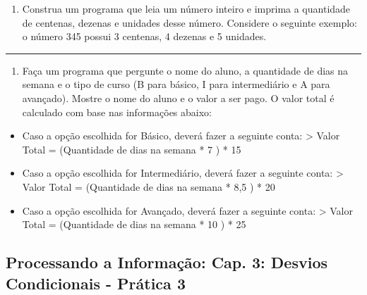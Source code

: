 \documentclass[12pt,a4paper]{article}
\providecommand{\tightlist}{%
      \setlength{\itemsep}{0pt}\setlength{\parskip}{0pt}}
\begin{document}
\begin{enumerate}
\def\labelenumi{\arabic{enumi}.}
\setcounter{enumi}{3}
\tightlist
\item
  Construa um programa que leia um número inteiro e imprima a quantidade
  de centenas, dezenas e unidades desse número. Considere o seguinte
  exemplo: o número 345 possui 3 centenas, 4 dezenas e 5 unidades.
\end{enumerate}

    \begin{center}\rule{0.5\linewidth}{0.5pt}\end{center}

\begin{enumerate}
\def\labelenumi{\arabic{enumi}.}
\setcounter{enumi}{4}
\tightlist
\item
  Faça um programa que pergunte o nome do aluno, a quantidade de dias na
  semana e o tipo de curso (B para básico, I para intermediário e A para
  avançado). Mostre o nome do aluno e o valor a ser pago. O valor total
  é calculado com base nas informações abaixo:
\end{enumerate}

\begin{itemize}
\tightlist
\item
  Caso a opção escolhida for Básico, deverá fazer a seguinte conta:
  \textgreater{} Valor Total = (Quantidade de dias na semana * 7 ) * 15
\item
  Caso a opção escolhida for Intermediário, deverá fazer a seguinte
  conta: \textgreater{} Valor Total = (Quantidade de dias na semana *
  8,5 ) * 20
\item
  Caso a opção escolhida for Avançado, deverá fazer a seguinte conta:
  \textgreater{} Valor Total = (Quantidade de dias na semana * 10 ) * 25
\end{itemize}

    \hypertarget{processando-a-informauxe7uxe3o-cap.-3-desvios-condicionais---pruxe1tica-3}{%
\subsection{Processando a Informação: Cap. 3: Desvios Condicionais -
Prática
3}\label{processando-a-informauxe7uxe3o-cap.-3-desvios-condicionais---pruxe1tica-3}}
\end{document}
